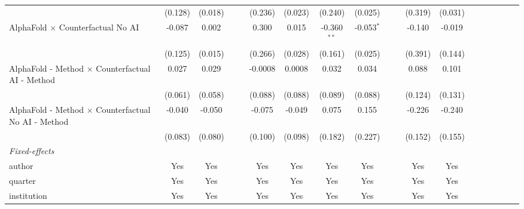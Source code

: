 \begin{tabular}{lcccccccccccccccccc}
                                                              & (0.128) & (0.018)     &     &     & (0.236) & (0.023)       & (0.240)       & (0.025)      &     &      & (0.319) & (0.031) &      &      &      &      &      &   \\   
   AlphaFold $\times$ Counterfactual No AI                    & -0.087  & 0.002       &     &     & 0.300   & 0.015         & -0.360$^{**}$ & -0.053$^{*}$ &     &      & -0.140  & -0.019  &      &      &      &      &      &   \\   
                                                              & (0.125) & (0.015)     &     &     & (0.266) & (0.028)       & (0.161)       & (0.025)      &     &      & (0.391) & (0.144) &      &      &      &      &      &   \\   
   AlphaFold - Method $\times$ Counterfactual AI - Method     & 0.027   & 0.029       &     &     & -0.0008 & 0.0008        & 0.032         & 0.034        &     &      & 0.088   & 0.101   &      &      &      &      &      &   \\   
                                                              & (0.061) & (0.058)     &     &     & (0.088) & (0.088)       & (0.089)       & (0.088)      &     &      & (0.124) & (0.131) &      &      &      &      &      &   \\   
   AlphaFold - Method $\times$ Counterfactual No AI - Method  & -0.040  & -0.050      &     &     & -0.075  & -0.049        & 0.075         & 0.155        &     &      & -0.226  & -0.240  &      &      &      &      &      &   \\   
                                                              & (0.083) & (0.080)     &     &     & (0.100) & (0.098)       & (0.182)       & (0.227)      &     &      & (0.152) & (0.155) &      &      &      &      &      &   \\   
   \midrule
   \emph{Fixed-effects}\\
   author                                                     & Yes     & Yes         &     &     & Yes     & Yes           & Yes           & Yes          &     &      & Yes     & Yes     &      &      &      &      &      & \\  
   quarter                                                    & Yes     & Yes         &     &     & Yes     & Yes           & Yes           & Yes          &     &      & Yes     & Yes     &      &      &      &      &      & \\  
   institution                                                & Yes     & Yes         &     &     & Yes     & Yes           & Yes           & Yes          &     &      & Yes     & Yes     &      &      &      &      &      & \\  

\end{tabular}
